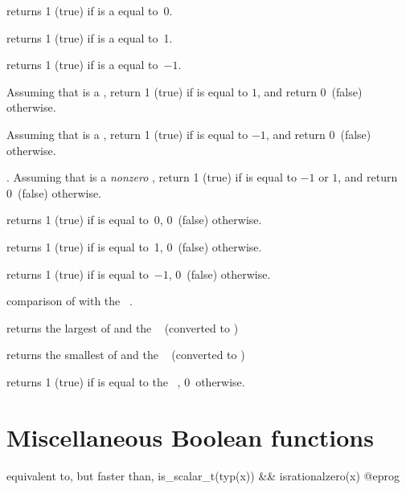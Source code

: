  returns 1 (true) if  is a 
equal to~0.

 returns 1 (true) if  is a 
equal to~1.

 returns 1 (true) if  is a 
equal to~$-1$.

Assuming that  is a , return 1 (true) if  is equal to
$1$, and return 0~(false) otherwise.

Assuming that  is a , return 1 (true) if  is equal to
$-1$, and return 0~(false) otherwise.

. Assuming that  is a
\emph{nonzero} , return 1 (true) if  is equal to $-1$ or
$1$, and return 0~(false) otherwise.

 returns 1 (true) if  is equal to~0, 0~(false)
otherwise.

 returns 1 (true) if  is equal to~1, 0~(false)
otherwise.

 returns 1 (true) if  is equal to~$-1$,
0~(false) otherwise.



 comparison of  with the
~.


 returns the largest of  and
the ~ (converted to )


 returns the smallest of  and the
~ (converted to )


 returns 1 (true) if  is equal to
the ~, 0~otherwise.

\section{Miscellaneous Boolean functions}

 equivalent to, but faster than,
\bprog
  is_scalar_t(typ(x)) && isrationalzero(x)
@eprog

